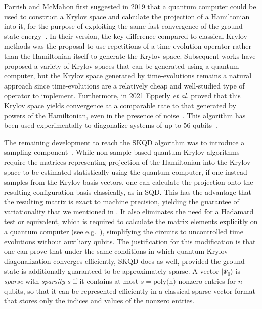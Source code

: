 \documentclass[
  reprint,            %
  amsmath,amssymb,
  aps,
  superscriptaddress, %
  longbibliography
]{revtex4-2}
\theoremstyle{definition}
\begin{document}
Parrish and McMahon first suggested in 2019 that a quantum computer could be used to construct a Krylov space and calculate the projection of a Hamiltonian into it, for the purpose of exploiting the same fast convergence of the ground state energy~\cite{parrish2019quantum}.
In their version, the key difference compared to classical Krylov methods was the proposal to use repetitions of a time-evolution operator rather than the Hamiltonian itself to generate the Krylov space.
Subsequent works have proposed a variety of Krylov spaces that can be generated using a quantum computer, but the Krylov space generated by time-evolutions remains a natural approach since time-evolutions are a relatively cheap and well-studied type of operator to implement.
Furthermore, in 2021 Epperly \emph{et al.} proved that this Krylov space yields convergence at a comparable rate to that generated by powers of the Hamiltonian, even in the presence of noise~\cite{epperly2021subspacediagonalization}.
This algorithm has been used experimentally to diagonalize systems of up to 56 qubits~\cite{yoshioka2024diagonalization}.

The remaining development to reach the SKQD algorithm was to introduce a sampling component~\cite{yu2025quantum}.
While non-sample-based quantum Krylov algorithms require the matrices representing projection of the Hamiltonian into the Krylov space to be estimated statistically using the quantum computer, if one instead samples from the Krylov basis vectors, one can calculate the projection onto the resulting configuration basis classically, as in SQD.
This has the advantage that the resulting matrix is exact to machine precision, yielding the guarantee of variationality that we mentioned in .
It also eliminates the need for a Hadamard test or equivalent, which is required to calculate the matrix elements explicitly on a quantum computer (see e.g.~\cite{cortes2022krylov,yoshioka2024diagonalization}), simplifying the circuits to uncontrolled time evolutions without auxiliary qubits.
The justification for this modification is that one can prove that under the same conditions in which quantum Krylov diagonalization converges efficiently, SKQD does as well, provided the ground state is additionally guaranteed to be approximately sparse.
A vector $|\Psi_0\rangle$ is \emph{sparse} with \emph{sparsity} $s$ if it contains at most $s=\text{poly(n)}$ nonzero entries for $n$ qubits, so that it can be represented efficiently in a classical sparse vector format that stores only the indices and values of the nonzero entries.
\end{document}
